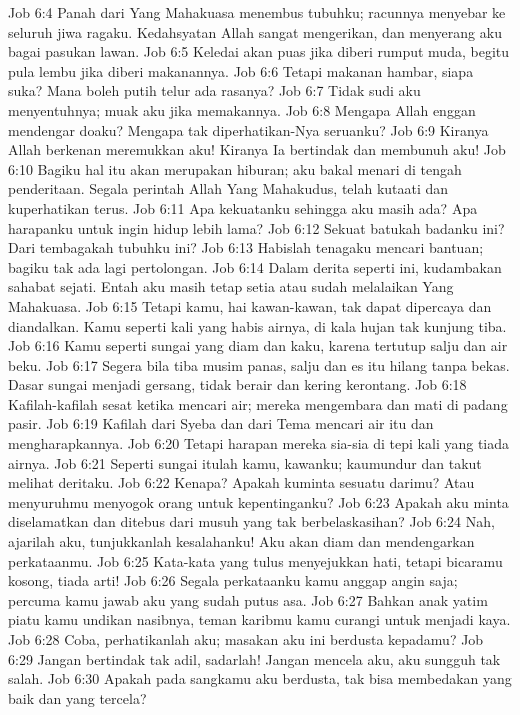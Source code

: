 Job 6:4  Panah dari Yang Mahakuasa menembus tubuhku; racunnya menyebar ke seluruh jiwa ragaku. Kedahsyatan Allah sangat mengerikan, dan menyerang aku bagai pasukan lawan.
Job 6:5  Keledai akan puas jika diberi rumput muda, begitu pula lembu jika diberi makanannya.
Job 6:6  Tetapi makanan hambar, siapa suka? Mana boleh putih telur ada rasanya?
Job 6:7  Tidak sudi aku menyentuhnya; muak aku jika memakannya.
Job 6:8  Mengapa Allah enggan mendengar doaku? Mengapa tak diperhatikan-Nya seruanku?
Job 6:9  Kiranya Allah berkenan meremukkan aku! Kiranya Ia bertindak dan membunuh aku!
Job 6:10  Bagiku hal itu akan merupakan hiburan; aku bakal menari di tengah penderitaan. Segala perintah Allah Yang Mahakudus, telah kutaati dan kuperhatikan terus.
Job 6:11  Apa kekuatanku sehingga aku masih ada? Apa harapanku untuk ingin hidup lebih lama?
Job 6:12  Sekuat batukah badanku ini? Dari tembagakah tubuhku ini?
Job 6:13  Habislah tenagaku mencari bantuan; bagiku tak ada lagi pertolongan.
Job 6:14  Dalam derita seperti ini, kudambakan sahabat sejati. Entah aku masih tetap setia atau sudah melalaikan Yang Mahakuasa.
Job 6:15  Tetapi kamu, hai kawan-kawan, tak dapat dipercaya dan diandalkan. Kamu seperti kali yang habis airnya, di kala hujan tak kunjung tiba.
Job 6:16  Kamu seperti sungai yang diam dan kaku, karena tertutup salju dan air beku.
Job 6:17  Segera bila tiba musim panas, salju dan es itu hilang tanpa bekas. Dasar sungai menjadi gersang, tidak berair dan kering kerontang.
Job 6:18  Kafilah-kafilah sesat ketika mencari air; mereka mengembara dan mati di padang pasir.
Job 6:19  Kafilah dari Syeba dan dari Tema mencari air itu dan mengharapkannya.
Job 6:20  Tetapi harapan mereka sia-sia di tepi kali yang tiada airnya.
Job 6:21  Seperti sungai itulah kamu, kawanku; kaumundur dan takut melihat deritaku.
Job 6:22  Kenapa? Apakah kuminta sesuatu darimu? Atau menyuruhmu menyogok orang untuk kepentinganku?
Job 6:23  Apakah aku minta diselamatkan dan ditebus dari musuh yang tak berbelaskasihan?
Job 6:24  Nah, ajarilah aku, tunjukkanlah kesalahanku! Aku akan diam dan mendengarkan perkataanmu.
Job 6:25  Kata-kata yang tulus menyejukkan hati, tetapi bicaramu kosong, tiada arti!
Job 6:26  Segala perkataanku kamu anggap angin saja; percuma kamu jawab aku yang sudah putus asa.
Job 6:27  Bahkan anak yatim piatu kamu undikan nasibnya, teman karibmu kamu curangi untuk menjadi kaya.
Job 6:28  Coba, perhatikanlah aku; masakan aku ini berdusta kepadamu?
Job 6:29  Jangan bertindak tak adil, sadarlah! Jangan mencela aku, aku sungguh tak salah.
Job 6:30  Apakah pada sangkamu aku berdusta, tak bisa membedakan yang baik dan yang tercela?
